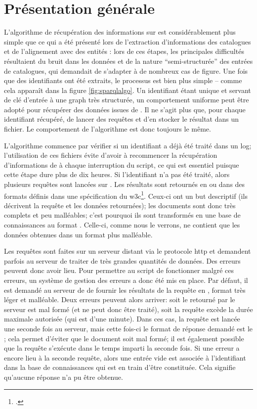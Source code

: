 \section{Présentation générale}
L'algorithme de récupération des informations sur \wkd{} est considérablement plus simple que ce qui a été présenté lors de l'extraction d'informations des catalogues et de l'alignement avec des entités \wkd{}: lors de ces étapes, les principales difficultés résultaient du bruit dans les données et de la nature \enquote{semi-structurée} des entrées de catalogues, qui demandait de s'adapter à de nombreux cas de figure. Une fois que des identifiants \wkd{} ont été extraits, le processus est bien plus simple -- comme cela apparaît dans la figure \ref{fig:sparqlalgo}. Un identifiant étant unique et servant de clé d'entrée à une \gls{graph} très structurée, un comportement uniforme peut être adopté pour récupérer des données issues de \wkd{}. Il ne s'agit plus que, pour chaque identifiant \wkd{} récupéré, de lancer des requêtes \sparql{} et d'en stocker le résultat dans un fichier. Le comportement de l'algorithme est donc toujours le même.

L'algorithme commence par vérifier si un identifiant a déjà été traité dans un \gls{log}; l'utilisation de ces fichiers évite d'avoir à recommencer la récupération d'informations de \wkd{} à chaque interruption du script, ce qui est essentiel puisque cette étape dure plus de dix heures. Si l'identifiant n'a pas été traité, alors plusieurs requêtes \sparql{} sont lancées sur \wkd{}. Les résultats sont retournés en \json{} ou \xml{} dans des formats définis dans une spécification du \gls{w3c}\footcite{beckett_sparql_2013}. Ceux-ci ont un but descriptif (ils décrivent la requête et les données retournées); les documents \sparql{} sont donc très complets et peu malléables; c'est pourquoi ils sont transformés en une base de connaissances au format \json{}. Celle-ci, comme nous le verrons, ne contient que les données obtenues dans un format plus malléable.

Les requêtes \sparql{} sont faites sur un serveur distant via le protocole \gls{http} et demandent parfois au serveur de traiter de très grandes quantités de données. Des erreurs peuvent donc avoir lieu. Pour permettre au script de fonctionner malgré ces erreurs, un système de gestion des erreurs a donc été mis en place. Par défaut, il est demandé au serveur de \wkd{} de fournir les résultats de la requête en \json{}, format très léger et malléable. Deux erreurs peuvent alors arriver: soit le \json{} retourné par le serveur est mal formé (et ne peut donc être traité), soit la requête excède la durée maximale autorisée (qui est d'une minute). Dans ces cas, la requête est lancée une seconde fois au serveur, mais cette fois-ci le format de réponse demandé est le \xml{}; cela permet d'éviter que le document soit mal formé; il est également possible que la requête s'exécute dans le temps imparti la seconde fois. Si une erreur a encore lieu à la seconde requête, alors une entrée vide est associée à l'identifiant \wkd{} dans la base de connaissances qui est en train d'être constituée. Cela signifie qu'aucune réponse n'a pu être obtenue.

